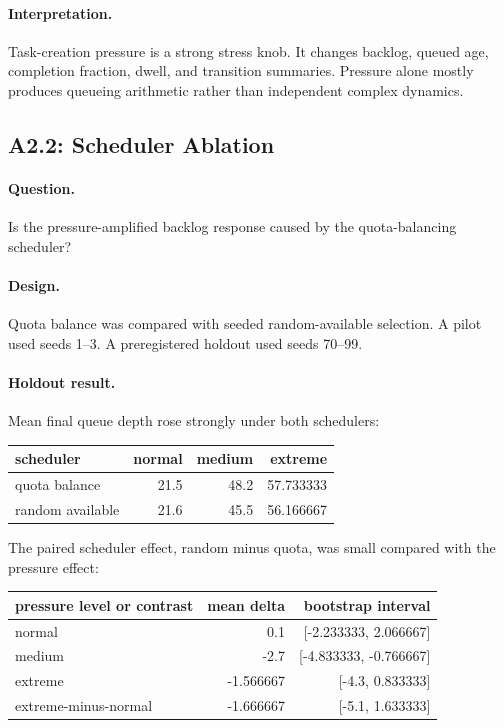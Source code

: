 \documentclass[11pt]{article}
\begin{document}
\paragraph{Interpretation.}
Task-creation pressure is a strong stress knob. It changes backlog, queued age,
completion fraction, dwell, and transition summaries. Pressure alone mostly
produces queueing arithmetic rather than independent complex dynamics.

\subsection{A2.2: Scheduler Ablation}

\paragraph{Question.}
Is the pressure-amplified backlog response caused by the quota-balancing
scheduler?

\paragraph{Design.}
Quota balance was compared with seeded random-available selection. A pilot used
seeds 1--3. A preregistered holdout used seeds 70--99.

\paragraph{Holdout result.}
Mean final queue depth rose strongly under both schedulers:

\begin{center}
\begin{tabular}{lrrr}
scheduler & normal & medium & extreme \\
\hline
quota balance & 21.5 & 48.2 & 57.733333 \\
random available & 21.6 & 45.5 & 56.166667
\end{tabular}
\end{center}

The paired scheduler effect, random minus quota, was small compared with the
pressure effect:

\begin{center}
\begin{tabular}{lrr}
pressure level or contrast & mean delta & bootstrap interval \\
\hline
normal & 0.1 & [-2.233333, 2.066667] \\
medium & -2.7 & [-4.833333, -0.766667] \\
extreme & -1.566667 & [-4.3, 0.833333] \\
extreme-minus-normal & -1.666667 & [-5.1, 1.633333]
\end{tabular}
\end{center}
\end{document}
